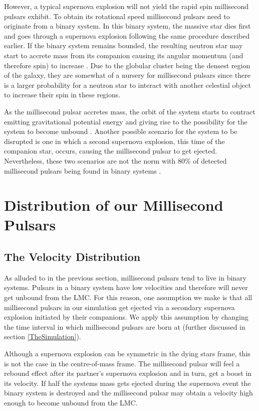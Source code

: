 However, a typical supernova explosion will not yield the rapid spin millisecond pulsars exhibit. To obtain its rotational speed millisecond pulsars need to originate from a binary system.  In this binary system, the massive star dies first and goes through a supernova explosion following the same procedure described earlier. If the binary system remains bounded, the resulting neutron star may start to accrete mass from its companion causing its angular momentum (and therefore spin) to increase \citep{NRAO}. Due to the globular cluster being the densest region of the galaxy, they are somewhat of a nursery for millisecond pulsars since there is a larger probability for a neutron star to interact with another celestial object to increase their spin in these regions. 

As the millisecond pulsar accretes mass, the orbit of the system starts to contract emitting gravitational potential energy and giving rise to the possibility for the system to become unbound \citep{Kulkarni1995}. Another possible scenario for the system to be disrupted is one in which a second supernova explosion, this time of the companion star, occurs, causing the millisecond pulsar to get ejected. Nevertheless, these two scenarios are not the norm with $80\%$ of detected millisecond pulsars being found in binary systems \citep{Lorimer2008}.


\section{Distribution of our Millisecond Pulsars}\label{MathematicalTheory}
\setcounter{figure}{0} 

\subsection*{The Velocity Distribution}\label{Velocity}
As alluded to in the previous section, millisecond pulsars tend to live in binary systems. Pulsars in a binary system have low velocities and therefore will never get unbound from the LMC. For this reason, one assumption we make is that all millisecond pulsars in our simulation get ejected via a secondary supernova explosion initiated by their companions. We apply this assumption by changing the time interval in which millisecond pulsars are born at (further discussed in section \ref{TheSimulation}). 

Although a supernova explosion can be symmetric in the dying stars frame, this is not the case in the centre-of-mass frame. The millisecond pulsar will feel a rebound effect after its partner's supernova explosion and in turn, get a boost in its velocity. If half the systems mass gets ejected during the supernova event the binary system is destroyed \citep{Hills} and the millisecond pulsar may obtain a velocity high enough to become unbound from the LMC.

